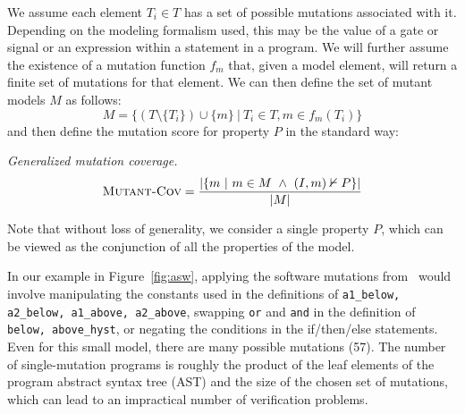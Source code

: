 We assume each element $T_i \in T$ has a set of possible mutations associated with it.  Depending on the modeling formalism used, this may be the value of a gate or signal or an expression within a statement in a program.  We will further assume the existence of a mutation function $f_{m}$ that, given a model element, will return a finite set of mutations for that element.  We can then define the set of mutant models $M$ as follows:
\[
    M = \{ (T \setminus \{T_i\}) \cup \{m\} \ |\ T_i \in T, m \in f_{m}(T_i) \}
\]
\noindent and then define the mutation score for property $P$ in the standard way:
\begin{definition} {\emph{Generalized mutation coverage.} } \\
\[
   \mutcov = \frac{ | \{m~|~ m \in M~\land~(I, m) \nvdash P\} |}{|M|}
\]
\end{definition}

\noindent Note that without loss of generality, we consider a single property $P$, which can be viewed as the conjunction of all the properties of the model.

In our example in Figure~\ref{fig:asw}, applying the software mutations from~\cite{Andrews06:mutation} would involve manipulating the constants used in the definitions of {\small \texttt{a1\_below, a2\_below, a1\_above, a2\_above}}, swapping {\small \texttt{or}} and {\small \texttt{and}} in the definition of {\small \texttt{below, above\_hyst}}, or negating the conditions in the if/then/else statements.  Even for this small model, there are many possible mutations (57).  The number of single-mutation programs is roughly the product of the leaf elements of the program abstract syntax tree (AST) and the size of the chosen set of mutations, which can lead to an impractical number of verification problems.

\newcommand{\andnode}{{\sc and}}
\newcommand{\invnode}{{\sc inv}}
\newcommand{\inpnode}{{\sc inp}}
\newcommand{\regnode}{{\sc reg}}
\newcommand{\mutnode}{{\sc mut}}
\newcommand{\inputnode}{{\sc input}}

